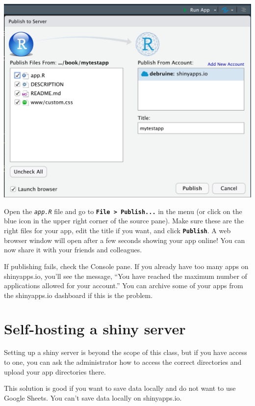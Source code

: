 \documentclass[
  oneside]{book}
\begin{document}
\includegraphics{images/saio_publish.png}

Open the \textit{\texttt{app.R}} file and go to \textbf{\texttt{File\ \textgreater{}\ Publish...}} in the menu (or click on the blue icon in the upper right corner of the source pane). Make sure these are the right files for your app, edit the title if you want, and click \textbf{\texttt{Publish}}. A web browser window will open after a few seconds showing your app online! You can now share it with your friends and colleagues.

\begin{info}
If publishing fails, check the Console pane. If you already have too many apps on shinyapps.io, you'll see the message, ``You have reached the maximum number of applications allowed for your account.'' You can archive some of your apps from the shinyapps.io dashboard if this is the problem.

\end{info}

\hypertarget{self-hosting-a-shiny-server}{%
\section{Self-hosting a shiny server}\label{self-hosting-a-shiny-server}}

Setting up a shiny server is beyond the scope of this class, but if you have access to one, you can ask the administrator how to access the correct directories and upload your app directories there.

This solution is good if you want to save data locally and do not want to use Google Sheets. You can't save data locally on shinyapps.io.
\end{document}
